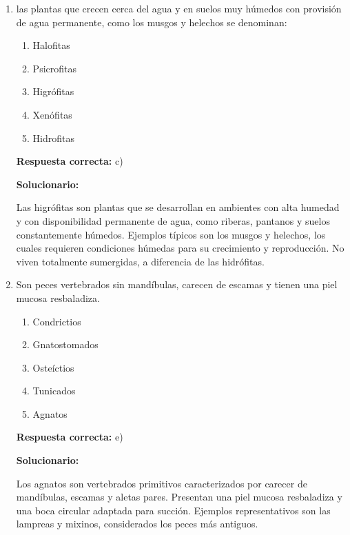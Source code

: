 	\begin{enumerate}[resume]

		\item las plantas que crecen cerca del agua y en suelos muy húmedos con provisión de agua permanente, como los musgos y helechos se denominan:

		\begin{enumerate}[label=\alph*)]
			\item Halofitas
			\item Psicrofitas
			\item Higrófitas
			\item Xenófitas
			\item Hidrofitas
		\end{enumerate}

		\textbf{Respuesta correcta:} c)

	\vspace{2mm}
	\textbf{Solucionario:}

	Las higrófitas son plantas que se desarrollan en ambientes con alta humedad y con disponibilidad permanente de agua, como riberas, pantanos y suelos constantemente húmedos. Ejemplos típicos son los musgos y helechos, los cuales requieren condiciones húmedas para su crecimiento y reproducción.
	No viven totalmente sumergidas, a diferencia de las hidrófitas.

		\vspace{6mm}

		\item Son peces vertebrados sin mandíbulas, carecen de escamas y tienen una piel mucosa resbaladiza.
		\begin{enumerate}[label=\alph*)]
			\item Condrictios
			\item Gnatostomados
			\item Osteíctios
			\item Tunicados
			\item Agnatos
		\end{enumerate}

		\textbf{Respuesta correcta:} e)

			\vspace{2mm}
		\textbf{Solucionario:}

		Los agnatos son vertebrados primitivos caracterizados por carecer de mandíbulas, escamas y aletas pares. Presentan una piel mucosa resbaladiza y una boca circular adaptada para succión. Ejemplos representativos son las lampreas y mixinos, considerados los peces más antiguos.

		\vspace{6mm}

	\end{enumerate}


